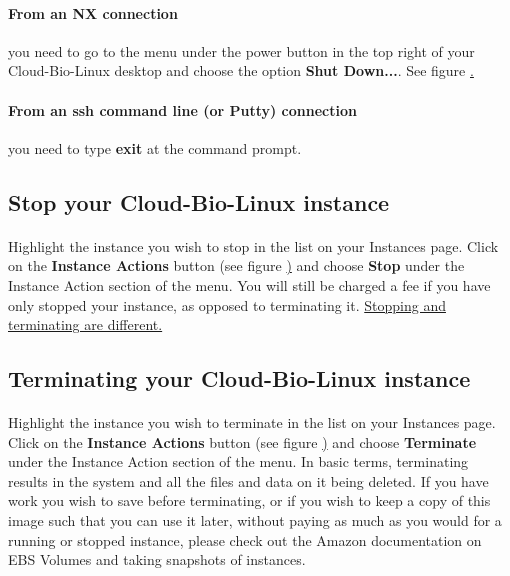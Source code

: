 \paragraph{From an NX connection} you need to go to the menu under the power button in the top right of your Cloud-Bio-Linux desktop and choose the option \textbf{Shut Down...}. See figure \href{fig:nxshutdown}.

\paragraph{From an ssh command line (or Putty) connection} you need to type \textbf{exit} at the command prompt.


\subsection{Stop your Cloud-Bio-Linux instance}

\paragraph{}Highlight the instance you wish to stop in the list on your Instances page. Click on the \textbf{Instance Actions} button (see figure \href{fig:instancesOptions}) and choose \textbf{Stop} under the Instance Action section of the menu. You will still be charged a fee if you have only stopped your instance, as opposed to terminating it. \href{http://support.rightscale.com/06-FAQs/FAQ\_0149\_-_What\%27s_the_difference_between_Terminating_and_Stopping_an_EC2_Instance\%3F}{Stopping and terminating are different.}

\subsection{Terminating your Cloud-Bio-Linux instance}

\paragraph{}Highlight the instance you wish to terminate in the list on your Instances page. Click on the \textbf{Instance Actions} button (see figure \href{fig:instancesOptions}) and choose \textbf{Terminate} under the Instance Action section of the menu. In basic terms, terminating results in the system and all the files and data on it being deleted. If you have work you wish to save before terminating, or if you wish to keep a copy of this image such that you can use it later, without paying as much as you would for a running or stopped instance, please check out the Amazon documentation on EBS Volumes and taking snapshots of instances.


